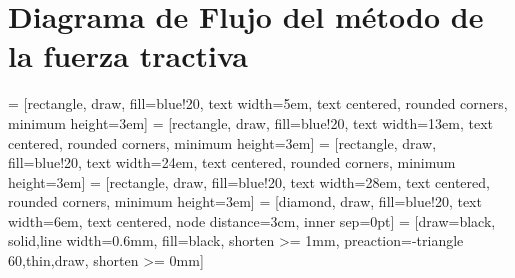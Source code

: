 \documentclass[10.5pt]{article}
\begin{document}
\section*{Diagrama de Flujo del método de la fuerza tractiva}


 = [rectangle, draw, fill=blue!20, text width=5em, text centered, rounded corners, minimum height=3em]
 = [rectangle, draw, fill=blue!20, text width=13em, text centered, rounded corners, minimum height=3em]
 = [rectangle, draw, fill=blue!20, text width=24em, text centered, rounded corners, minimum height=3em]
 = [rectangle, draw, fill=blue!20, text width=28em, text centered, rounded corners, minimum height=3em]
 = [diamond, draw, fill=blue!20, text width=6em, text centered, node distance=3cm, inner sep=0pt]
 = [draw=black, solid,line width=0.6mm, fill=black, shorten >= 1mm, preaction={-triangle 60,thin,draw, shorten >= 0mm}] 
\end{document}
